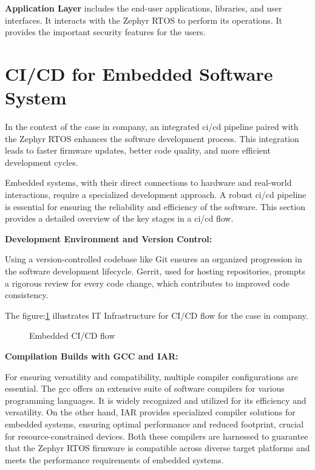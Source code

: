 \textbf{Application Layer} includes the end-user applications, libraries, and
user interfaces. It interacts with the Zephyr RTOS to perform its operations. It provides the
important security features for the users.

\section{CI/CD for Embedded Software System}
In the context of the case in company, an integrated \gls{ci/cd} pipeline paired with the
Zephyr RTOS enhances the software development process. This integration leads to faster
firmware updates, better code quality, and more efficient development cycles.

Embedded systems, with their direct connections to hardware and real-world interactions,
require a specialized development approach. A robust \gls{ci/cd} pipeline is essential for
ensuring the reliability and efficiency of the software. This section provides a detailed
overview of the key stages in a \gls{ci/cd} flow.

\textbf{Development Environment and Version Control:}

Using a version-controlled codebase like Git\cite{loeliger2012version} ensures
an organized progression in the software development lifecycle. Gerrit\cite{milanesio2013learning},
used for hosting repositories, prompts a rigorous review for every code change,
which contributes to improved code consistency.

The figure:\ref{fig:CI_Infrastrcuture_1} illustrates IT Infrastructure for CI/CD flow for the
case in company.


\begin{figure}[h]
        \centering
        \caption{Embedded CI/CD flow}\label{fig:CI_Infrastrcuture_1}
\end{figure}

\textbf{Compilation Builds with GCC and IAR:}

For ensuring versatility and compatibility, multiple compiler configurations are essential.
The \gls{gcc} offers an extensive suite of software compilers
for various programming languages. It is widely recognized and utilized for its
efficiency and versatility\cite{GCCtheGN9:online}.
On the other hand, \gls{IAR} provides specialized compiler solutions for embedded systems,
ensuring optimal performance and reduced footprint, crucial for resource-constrained
devices\cite{AboutIAR98:online}.
Both these compilers are harnessed to guarantee that the Zephyr RTOS firmware
is compatible across diverse target platforms and meets the performance
requirements of embedded systems.

